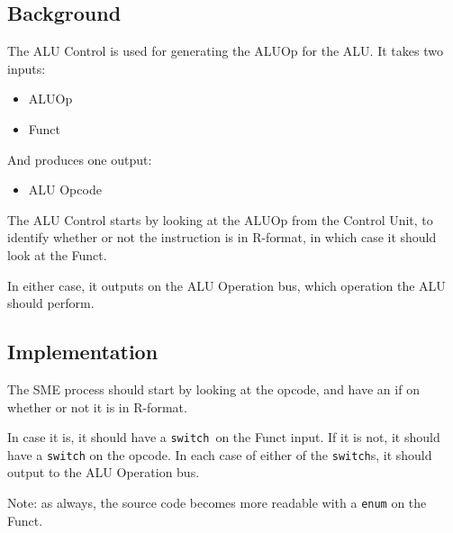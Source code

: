 \documentclass{beamer}
\begin{document}
\subsection{Background}
\begin{frame}
    The ALU Control is used for generating the ALUOp for the ALU. It takes two
    inputs:
    \begin{itemize}
        \item ALUOp
        \item Funct
    \end{itemize}
    And produces one output:
    \begin{itemize}
        \item ALU Opcode
    \end{itemize}
\end{frame}
\begin{frame}
    \begin{figure}
    \end{figure}
\end{frame}
\begin{frame}
    The ALU Control starts by looking at the ALUOp from the Control Unit, to
    identify whether or not the instruction is in R-format, in which case it
    should look at the Funct.

    \vspace{\baselineskip}
    In either case, it outputs on the ALU Operation bus, which operation the
    ALU should perform.
\end{frame}
\subsection{Implementation}
\begin{frame}
    The SME process should start by looking at the opcode, and have an if on
    whether or not it is in R-format.

    \vspace{\baselineskip}
    In case it is, it should have a \texttt{switch} on the Funct input. If
    it is not, it should have a \texttt{switch} on the opcode. In each case of
    either of the \texttt{switch}s, it should output to the ALU Operation bus.

    \vspace{\baselineskip}
    Note: as always, the source code becomes more readable with a \texttt{enum}
    on the Funct.
\end{frame}
\end{document}
